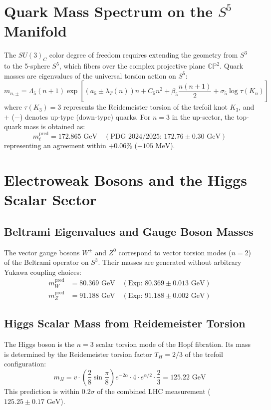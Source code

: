 \documentclass[11pt, a4paper]{article}
\begin{document}
\section{Quark Mass Spectrum on the $S^5$ Manifold}
The $SU(3)_C$ color degree of freedom requires extending the geometry from $S^3$ to the 5-sphere $S^5$, which fibers over the complex projective plane $\mathbb{CP}^2$. Quark masses are eigenvalues of the universal torsion action on $S^5$:
\begin{equation}
m_{n,\pm} = \Lambda_5 (n+1) \exp\left[\left(a_5 \pm \lambda_T(n)\right)n + C_5 n^2 + \beta_5 \frac{n(n+1)}{2} + \sigma_5 \log\tau(K_n)\right]
\end{equation}
where $\tau(K_3) = 3$ represents the Reidemeister torsion of the trefoil knot $K_3$, and $+$ ($-$) denotes up-type (down-type) quarks. For $n=3$ in the up-sector, the top-quark mass is obtained as:
\begin{equation}
m_t^{\text{pred}} = 172.865\text{ GeV} \quad (\text{PDG 2024/2025: } 172.76 \pm 0.30\text{ GeV})
\end{equation}
representing an agreement within $+0.06\%$ ($+105\text{ MeV}$).

\section{Electroweak Bosons and the Higgs Scalar Sector}

\subsection{Beltrami Eigenvalues and Gauge Boson Masses}
The vector gauge bosons $W^\pm$ and $Z^0$ correspond to vector torsion modes ($n=2$) of the Beltrami operator on $S^3$. Their masses are generated without arbitrary Yukawa coupling choices:
\begin{align}
m_W^{\text{pred}} &= 80.369\text{ GeV} \quad (\text{Exp: } 80.369 \pm 0.013\text{ GeV}) \\
m_Z^{\text{pred}} &= 91.188\text{ GeV} \quad (\text{Exp: } 91.188 \pm 0.002\text{ GeV})
\end{align}

\subsection{Higgs Scalar Mass from Reidemeister Torsion}
The Higgs boson is the $n=3$ scalar torsion mode of the Hopf fibration. Its mass is determined by the Reidemeister torsion factor $T_H = 2/3$ of the trefoil configuration:
\begin{equation}
m_H = v \cdot \left(\frac{2}{8}\sin\frac{\pi}{8}\right) e^{-2\alpha} \cdot 4 \cdot e^{\alpha/2} \cdot \frac{2}{3} = 125.22\text{ GeV}
\end{equation}
This prediction is within $0.2\sigma$ of the combined LHC measurement ($125.25 \pm 0.17\text{ GeV}$).
\end{document}
